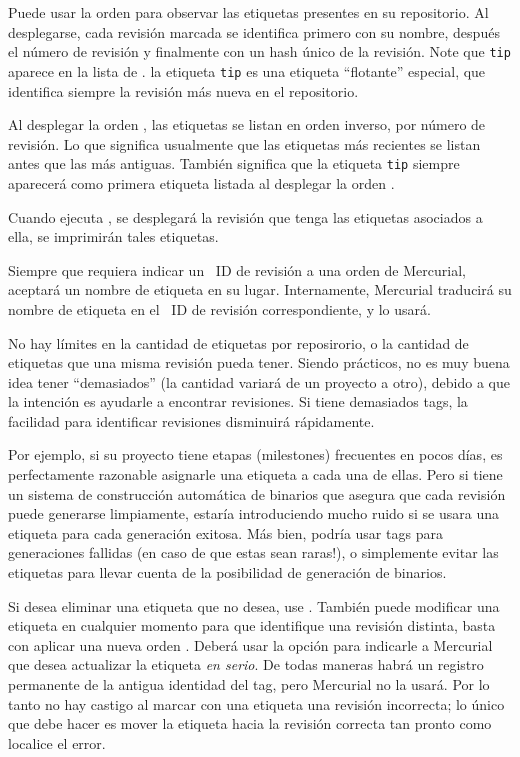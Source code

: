 Puede usar la orden  para observar las etiquetas presentes en
su repositorio. Al desplegarse, cada revisión marcada se identifica
primero con su nombre, después el número de revisión y finalmente con
un hash único de la revisión.
Note que \texttt{tip} aparece en la lista de .  la etiqueta
\texttt{tip} es una etiqueta ``flotante'' especial, que identifica siempre
la revisión más nueva en el repositorio.

Al desplegar la orden , las etiquetas se listan en orden
inverso, por número de revisión. Lo que significa usualmente que las etiquetas más recientes se listan antes que las más antiguas. También
significa que la etiqueta \texttt{tip} siempre aparecerá como primera
etiqueta listada al desplegar la orden .

Cuando ejecuta , se desplegará la revisión que tenga las etiquetas asociados a ella, se imprimirán tales etiquetas.

Siempre que requiera indicar un ~ID de revisión a una orden de
Mercurial, aceptará un nombre de etiqueta en su lugar.  Internamente,
Mercurial traducirá su nombre de etiqueta en el ~ID de revisión
correspondiente, y lo usará.

No hay límites en la cantidad de etiquetas por reposirorio, o la cantidad
de etiquetas que una misma revisión pueda tener. Siendo prácticos, no es
muy buena idea tener ``demasiados'' (la cantidad variará de un
proyecto a otro), debido a que la intención es ayudarle a encontrar
revisiones. Si tiene demasiados tags, la facilidad para identificar
revisiones disminuirá rápidamente.

Por ejemplo, si su proyecto tiene etapas (milestones) frecuentes en pocos
días, es perfectamente razonable asignarle una etiqueta a cada una de
ellas. Pero si tiene un sistema de construcción automática de binarios
que asegura que cada revisión puede generarse limpiamente, estaría
introduciendo mucho ruido si se usara una etiqueta para cada generación
exitosa. Más bien, podría usar tags para generaciones fallidas (en
caso de que estas sean raras!), o simplemente evitar las etiquetas para
llevar cuenta de la posibilidad de generación de binarios.


Si desea eliminar una etiqueta que no desea, use
.  
También puede modificar una etiqueta en cualquier momento para que
identifique una revisión distinta, basta con aplicar una nueva orden
. Deberá usar la opción  para indicarle a
Mercurial que desea actualizar la etiqueta \emph{en serio}.
De todas maneras habrá un registro permanente de la antigua identidad
del tag, pero Mercurial no la usará. Por lo tanto no hay castigo al
marcar con una etiqueta una revisión incorrecta; lo único que debe hacer es
mover la etiqueta hacia la revisión correcta tan pronto como localice el
error.

